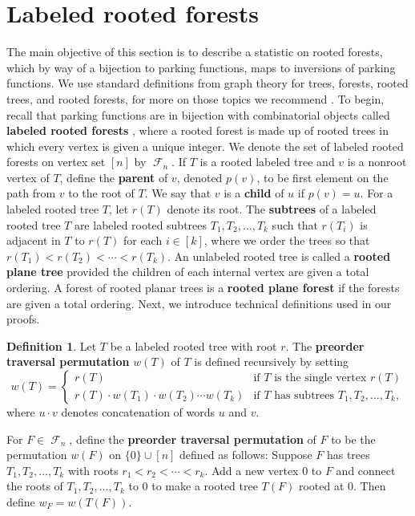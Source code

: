 \documentclass{amsart}
\newcommand{\defterm}{\textbf}
\DeclareMathOperator{\F}{\mathcal{F}}
\theoremstyle{definition}
\newtheorem{definition}[theorem]{Definition}
\begin{document}
\section{Labeled rooted forests}\label{sec:labeled rooted forests}
The main objective of this section is to describe a statistic on rooted forests, which by way of a bijection to parking functions, maps to inversions of parking functions. 
We use standard definitions from graph theory for trees, forests, rooted trees, and rooted forests, for more on those topics we recommend \cite{DiestelGraph}.
To begin, recall that parking functions are in bijection with combinatorial objects called \defterm{labeled rooted forests} \cite{Konheim1966}, where a rooted forest is made up of rooted trees in which every vertex is given a unique integer. 
We denote the set of labeled rooted forests on vertex set $[n]$ by $\F_n$. 
If $T$ is a rooted labeled tree and $v$ is a nonroot vertex of $T$, define the \defterm{parent} of $v$, denoted $p(v)$, to be first element on the path from $v$ to the root of $T$. 
We say that $v$ is a \defterm{child} of $u$ if $p(v)=u$.
For a labeled rooted tree $T$, let $r(T)$ denote its root. 
The \defterm{subtrees} of a labeled rooted tree $T$ are labeled rooted subtrees $T_1,T_2,\dots,T_k$ such that $r(T_i)$ is adjacent in $T$ to $r(T)$ for each $i\in [k]$, where we order the trees so that $r(T_1)<r(T_2)<\cdots<r(T_k)$. 
An unlabeled rooted tree is called a \textbf{rooted plane tree} provided the children of each internal vertex are given a total ordering. 
A forest of rooted planar trees is a \textbf{rooted plane forest} 
if the forests are given a total ordering.
Next, we introduce technical definitions used in our proofs.
\begin{definition}
Let $T$ be a labeled rooted tree with root $r$. 
The \defterm{preorder traversal permutation} $w(T)$ of $T$ is defined recursively by setting 
\[w(T)=\begin{cases}
    r(T)&\text{if $T$ is the single vertex $r(T)$}\\
    r(T)\cdot w(T_1)\cdot w(T_2)\cdots w(T_k)&\text{if $T$ has subtrees $T_1,T_2,\dots,T_k$},
\end{cases}\]
where $u\cdot v$ denotes concatenation of words $u$ and $v$. 

 For $F\in \F_n$, define the \defterm{preorder traversal permutation} of $F$ to be the permutation $w(F)$ on $\{0\}\cup [n]$ 
 defined as follows: Suppose $F$ has trees $T_1,T_2,\dots,T_k$ with roots $r_1<r_2<\cdots<r_k$. 
 Add a new vertex 0 to $F$ and connect the roots of $T_1,T_2,\dots,T_k$ to $0$ to make a rooted tree $T(F)$
 rooted at 0.  Then define $w_F=w(T(F))$.
\end{definition}
\end{document}

